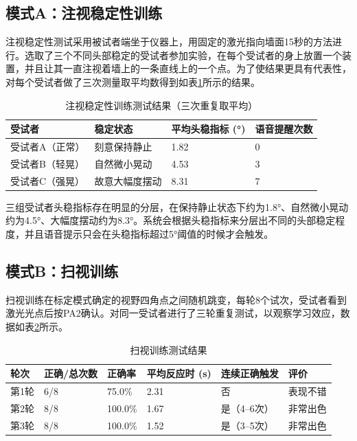 \subsection{模式A：注视稳定性训练}

注视稳定性测试采用被试者端坐于仪器上，用固定的激光指向墙面15秒的方法进行。选取了三个不同头部稳定的受试者参加实验，在每个受试者的身上放置一个装置，并且让其一直注视着墙上的一条直线上的一个点。为了使结果更具有代表性，对每个受试者做了三次测量取平均数得到如表\ref{tab:fixation_test}所示的结果。

\begin{table}[h!]
\centering
\caption{注视稳定性训练测试结果（三次重复取平均）}
\label{tab:fixation_test}
\begin{tabular}{p{3.5cm} p{2.5cm} p{2.5cm} p{2.5cm}}
\toprule[1.5pt]
\textbf{受试者} & \textbf{稳定状态} & \textbf{平均头稳指标 (°)} & \textbf{语音提醒次数} \\
\midrule[1pt]
受试者A（正常） & 刻意保持静止   & 1.82  & 0 \\
受试者B（轻晃） & 自然微小晃动  & 4.53  & 3 \\
受试者C（强晃） & 故意大幅度摆动 & 8.31  & 7 \\
\bottomrule[1.5pt]
\end{tabular}
\end{table}

三组受试者头稳指标存在明显的分层，在保持静止状态下约为1.8°、自然微小晃动约为4.5°、大幅度摆动约为8.3°。系统会根据头稳指标来分层出不同的头部稳定程度，并且语音提示只会在头稳指标超过5°阈值的时候才会触发。

\subsection{模式B：扫视训练}

扫视训练在标定模式确定的视野四角点之间随机跳变，每轮8个试次，受试者看到激光光点后按PA2确认。对同一受试者进行了三轮重复测试，以观察学习效应，数据如表\ref{tab:saccade_test}所示。

\begin{table}[h!]
\centering
\caption{扫视训练测试结果}
\label{tab:saccade_test}
\begin{tabular}{p{1.5cm} p{2cm} p{1.6cm} p{2.2cm} p{2.5cm} p{2cm}}
\toprule[1.5pt]
\textbf{轮次} & \textbf{正确/总次数} & \textbf{正确率} & \textbf{平均反应时 (s)} & \textbf{连续正确触发} & \textbf{评价} \\
\midrule[1pt]
第1轮 & 6/8  & 75.0\%  & 2.31  & 否 & 表现不错 \\
第2轮 & 8/8  & 100.0\% & 1.67  & 是（4--6次）& 非常出色 \\
第3轮 & 8/8  & 100.0\% & 1.52  & 是（3--5次）& 非常出色 \\
\bottomrule[1.5pt]
\end{tabular}
\end{table}

